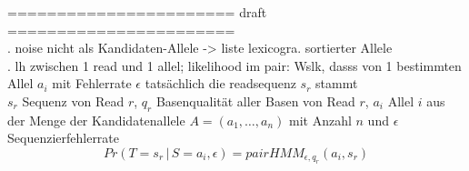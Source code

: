 \noindent======================= draft =======================\\

. noise nicht als Kandidaten-Allele -> liste lexicogra. sortierter Allele\\

. lh zwischen 1 read und 1 allel; likelihood im pair: Wslk, dasss von 1 bestimmten Allel $a_{i}$ mit Fehlerrate $\epsilon$ tatsächlich die readsequenz $s_{r}$ stammt \\
$s_{r}$ Sequenz von Read $r$, $q_{r}$ Basenqualität aller Basen von Read $r$, $a_{i}$ Allel $i$ aus der Menge der Kandidatenallele $A=(a_{1},\dots, a_{n})$ mit Anzahl $n$ und $\epsilon$ Sequenzierfehlerrate
\begin{equation} \label{eqn:2-16}
\tag{2-16}
Pr(T=s_{r} \, | \, S=a_{i}, \epsilon) = pairHMM_{\epsilon,q_{r}}(a_{i}, s_{r})
\end{equation}

